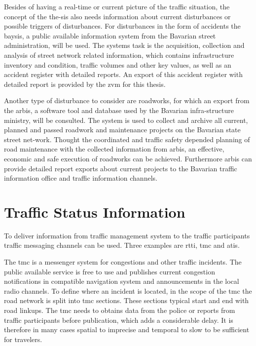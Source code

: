 \documentclass[a4paper,12pt]{report}
\begin{document}
Besides of having a real-time or current picture of the traffic situation, the concept of the the-sis also needs information about current disturbances or possible triggers of disturbances. For disturbances in the form of accidents the \acrfull{baysis}, a public available information system from the Bavarian street administration, will be used. The systems task is the acquisition, collection and analysis of street network related information, which contains infrastructure inventory and condition, traffic volumes and other key values, as well as an accident register with detailed reports. An export of this accident register with detailed report is provided by the \acrshort{zvm} for this thesis.

Another type of disturbance to consider are roadworks, for which an export from the \acrfull{arbis}, a software tool and database used by the Bavarian infra-structure ministry, will be consulted. The system is used to collect and archive all current, planned and passed roadwork and maintenance projects on the Bavarian state street net-work. Thought the coordinated and traffic safety depended planning of road maintenance with the collected information from \acrshort{arbis}, an effective, economic and safe execution of roadworks can be achieved. Furthermore \acrshort{arbis} can provide detailed report exports about current projects to the Bavarian traffic information office and traffic information channels. \cite{trafficon2017}

\section{Traffic Status Information}

To deliver information from traffic management system to the traffic participants traffic messaging channels can be used. Three examples are \acrfull{rtti}, \acrfull{tmc} and \acrfull{atis}.

The \acrfull{tmc} is a messenger system for congestions and other traffic incidents. The public available service is free to use and publishes current congestion notifications in compatible navigation system and announcements in the local radio channels. To define where an incident is located, in the scope of the \acrshort{tmc} the road network is split into \acrshort{tmc} sections. These sections typical start and end with road linkups. The \acrshort{tmc} needs to obtains data from the police or reports from traffic participants before publication, which adds a considerable delay. It is therefore in many cases spatial to imprecise and temporal to slow to be sufficient for travelers. \cite{LAPID2020}
\end{document}
